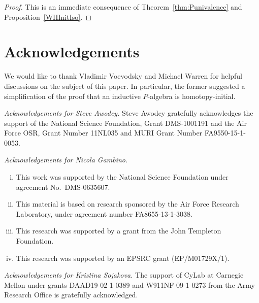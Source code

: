 \documentclass[10pt,a4paper,oneside,reqno]{amsart}
\numberwithin{equation}{section}
\theoremstyle{mythm}
\theoremstyle{mydef}
\theoremstyle{myrmk}
\begin{document}
\begin{proof} This is an immediate consequence of Theorem~\ref{thm:Punivalence} and Proposition~\ref{WHInitIso}. 
\end{proof} 






\section*{Acknowledgements}

We would like to thank Vladimir Voevodsky and Michael Warren for helpful discussions
on the subject of this paper. In particular, the former suggested a simplification of the 
proof that an inductive $P$-algebra is homotopy-initial. \smallskip
 
 \noindent
 \emph{Acknowledgements for Steve Awodey.}  Steve Awodey gratefully acknowledges the support of the National Science Foundation, Grant DMS-1001191 and the Air Force OSR, Grant Number 11NL035 and MURI Grant Number FA9550-15-1-0053. \smallskip
 
 \noindent
 \emph{Acknowledgements for Nicola Gambino.}   
 \begin{enumerate}[(i)]
 \item This work was supported by the National Science Foundation 
under agreement No.\ DMS-0635607. 
\item This material is based on research sponsored by the Air Force Research Laboratory, under agreement 
number FA8655-13-1-3038. \item This research was supported by a grant from the John Templeton Foundation.
\item This research was supported by an EPSRC grant (EP/M01729X/1). 
\end{enumerate}

\smallskip

\noindent
\emph{Acknowledgements for Kristina Sojakova.} The support of CyLab at Carnegie
Mellon under grants DAAD19-02-1-0389 and W911NF-09-1-0273 from the Army
Research Office is gratefully acknowledged.











                        
\end{document}
